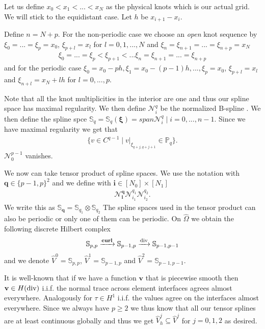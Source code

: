 \documentclass[../master_thesis.tex]{subfiles}
\begin{document}
Let us define $x_0 < x_1 < ... < x_N$ as the physical knots which 
is our actual grid. We will stick to the equidistant case. Let $h$ be 
$x_{i+1} - x_i$.

Define $n = N + p$.
For the non-periodic case we choose an \textit{open} knot sequence by 
$\xi_0 = ... = \xi_p = x_0$, $\xi_{p+l} = x_l$ for $l = 0,1,...,N$ and 
$\xi_{n} = \xi_{n+1} = ... = \xi_{n+p} = x_N$
\begin{align*}
    \xi_0 = ... = \xi_p < \xi_{p+1} < ... \xi_{n} = \xi_{n+1} = ... = \xi_{n+p}    
\end{align*}
and for the periodic case 
$\xi_0 = x_0-ph, \xi_1 = x_0-(p-1)h, ..., \xi_p = x_0$,
$\xi_{p+l} = x_l$ and $\xi_{n+l} = x_N + lh$ for $l = 0, ..., p$. 

Note that all the knot multiplicities in the interior are one and thus our spline 
space has maximal regularity. We then define 
$\mathcal{N}_i^q$ be the normalized B-spline \cite[Ref. 46, Def.4.19]{multipatch paper}.
We then define the spline spce $\mathbb{S}_q = \mathbb{S}_q(\bm{\xi}) = 
span{\mathcal{N}_i^q \mid i = 0, ..., n-1}$. Since we have maximal regularity 
we get that 
\begin{align*}
    \{ v \in C^{q-1} \mid v |_{\xi_{q+j, q+j+1}} \in \mathbb{P}_q \}.
\end{align*}
$\mathcal{N}_0^{p-1} $ vanishes.


We now can take tensor product of spline spaces. We use the notation 
with $\mathbf{q} \in \{p-1,p\}^2$ and we define with $\mathbf{i} \in [N_0 ] \times [ N_1 ]$
\begin{align*}
    \mathcal{N}_\mathbf{i}^\mathbf{q} \mathcal{N}_{i_1}^{q_1} \mathcal{N}_{i_2}^{q_2}.
\end{align*}
We write this as $\mathbb{S}_\mathbf{q} = \mathbb{S}_{q_1} \otimes \mathbb{S}_{q_2}$ 
The spline spaces used in the tensor product can also be periodic or only one of them 
can be periodic.
On $\hat{\Omega}$ we obtain the following discrete Hilbert complex 
\begin{align*}
    \mathbb{S}_{p,p} \xrightarrow{\veccurl} \mathbb{S}_{p-1,p} \xrightarrow{\diver} \mathbb{S}_{p-1,p-1}
\end{align*}
and we denote $\hat{V}^0 = \mathbb{S}_{p,p}$, $\hat{V}^1 = \mathbb{S}_{p-1,p}$ 
and $\hat{V}^2 = \mathbb{S}_{p-1,p-1}$. 

It is well-known that if we have a function $\mathbf{v}$ that is piecewise smooth 
then $\mathbf{v} \in H(\operatorname{div})$ i.i.f. the normal trace across element interfaces
agrees almost everywhere. Analogously for $\tau \in H^1$ i.i.f. the values agree 
on the interfaces almost everywhere. Since we always have $p \geq 2$ we thus know that 
all our tensor splines are at least continuous globally and thus we get 
$\hat{V}_h^j \subseteq \hat{V}^j$ for $j=0,1,2$ as desired. 
\end{document}

